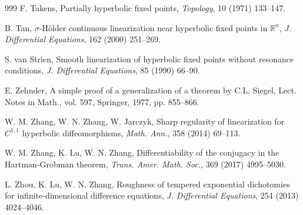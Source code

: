 \documentclass[reqno]{amsart}
\numberwithin{equation}{section}
\begin{document}
\begin{thebibliography}{999}
F. Takens, Partially hyperbolic fixed points, {\em Topology}, 10 (1971) 133--147.


B. Tan, $\sigma$-H\"{o}lder continuous linearization near hyperbolic fixed points in $\mathbb{R}^n$, {\em J. Differential Equations},
162 (2000) 251--269.



S. van Strien, Smooth linearization of hyperbolic fixed points without resonance conditions,  {\em J. Differential Equations}, 85 (1990)  66--90.


E. Zehnder, A simple proof of a generalization of a theorem by C.L. Siegel,  Lect. Notes in Math.,
vol. 597, Springer, 1977, pp. 855--866.




W. M.  Zhang, W. N.  Zhang, W. Jarczyk, Sharp regularity of linearization for $C^{1,1}$ hyperbolic diffeomorphisms, {\em  Math. Ann.},  358  (2014) 69--113.


W. M.  Zhang, K. Lu, W. N.  Zhang, Differentiability of the conjugacy in the Hartman-Grobman theorem, {\em Trans. Amer. Math. Soc.},  369 (2017) 4995--5030.


L. Zhou, K. Lu, W. N. Zhang, Roughness of tempered exponential dichotomies for infinite-dimensional difference
equations, {\em J. Differential Equations}, 254 (2013)  4024--4046.

\end{thebibliography}
\end{document}
